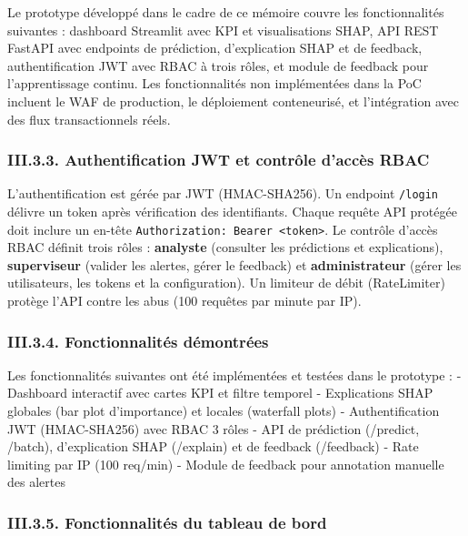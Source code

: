 \documentclass[
  12pt,
]{article}
\begin{document}
Le prototype développé dans le cadre de ce mémoire couvre les
fonctionnalités suivantes : dashboard Streamlit avec KPI et
visualisations SHAP, API REST FastAPI avec endpoints de prédiction,
d’explication SHAP et de feedback, authentification JWT avec RBAC à
trois rôles, et module de feedback pour l’apprentissage continu. Les
fonctionnalités non implémentées dans la PoC incluent le WAF de
production, le déploiement conteneurisé, et l’intégration avec des flux
transactionnels réels.

\subsubsection{III.3.3. Authentification JWT et contrôle d’accès
RBAC}\label{iii.3.3.-authentification-jwt-et-contruxf4le-daccuxe8s-rbac}

L’authentification est gérée par JWT (HMAC-SHA256). Un endpoint
\texttt{/login} délivre un token après vérification des identifiants.
Chaque requête API protégée doit inclure un en-tête
\texttt{Authorization:\ Bearer\ \textless{}token\textgreater{}}. Le
contrôle d’accès RBAC définit trois rôles : \textbf{analyste} (consulter
les prédictions et explications), \textbf{superviseur} (valider les
alertes, gérer le feedback) et \textbf{administrateur} (gérer les
utilisateurs, les tokens et la configuration). Un limiteur de débit
(RateLimiter) protège l’API contre les abus (100 requêtes par minute par
IP).

\subsubsection{III.3.4. Fonctionnalités
démontrées}\label{iii.3.4.-fonctionnalituxe9s-duxe9montruxe9es}

Les fonctionnalités suivantes ont été implémentées et testées dans le
prototype : - Dashboard interactif avec cartes KPI et filtre temporel -
Explications SHAP globales (bar plot d’importance) et locales (waterfall
plots) - Authentification JWT (HMAC-SHA256) avec RBAC 3 rôles - API de
prédiction (/predict, /batch), d’explication SHAP (/explain) et de
feedback (/feedback) - Rate limiting par IP (100 req/min) - Module de
feedback pour annotation manuelle des alertes

\subsubsection{III.3.5. Fonctionnalités du tableau de
bord}\label{iii.3.5.-fonctionnalituxe9s-du-tableau-de-bord}
\end{document}
